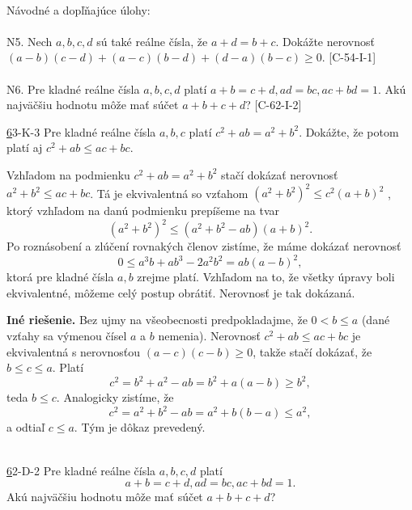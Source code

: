 \\
Návodné a dopľňajúce úlohy:\\
\\
N5. Nech $a, b, c, d$ sú také reálne čísla, že $a + d = b + c$. Dokážte nerovnosť $(a - b)(c - d)+ (a - c)(b - d) + (d - a)(b - c) \geq 0$. [C-54-I-1]\\
\\
N6. Pre kladné reálne čísla $a, b, c, d$ platí $a + b = c + d, ad = bc, ac + bd = 1$. Akú najväčšiu hodnotu môže mať súčet $a + b + c + d$? [C-62-I-2]\\

\begin{tcolorbox}[breakable,notitle,boxrule=0pt,colback=light-gray,colframe=light-gray]\ul 63-K-3 Pre kladné reálne čísla $a, b, c$ platí $c^2 + ab = a^2 + b^2$. Dokážte, že potom platí aj $c^2 + ab \leq ac + bc$.\\


\end{tcolorbox}

\rie Vzhľadom na podmienku $c^2 + ab = a^2 + b^2$ stačí dokázať nerovnosť $a^2 + b^2 \leq ac + bc$. Tá je ekvivalentná so vzťahom $(a^2 + b^2)^2 \leq c^2 (a + b)^2$ , ktorý vzhľadom
na danú podmienku prepíšeme na tvar $$ (a^2+ b^2)^2 \leq (a^2+
b^2 - ab)(a + b)^2.$$
Po roznásobení a zlúčení rovnakých členov zistíme, že máme dokázať nerovnosť $$0 \leq a^3b + ab^3 - 2a^2b^2= ab(a - b)^2,$$ ktorá pre kladné čísla $a, b$ zrejme platí. Vzhľadom na to, že všetky úpravy boli ekvivalentné, môžeme celý postup obrátiť. Nerovnosť je tak dokázaná.

\textbf{Iné riešenie.} Bez ujmy na všeobecnosti predpokladajme, že $0 < b \leq a$ (dané vzťahy sa výmenou čísel $a$ a $b$ nemenia). Nerovnosť $c^2 +ab \leq ac+bc$ je ekvivalentná s nerovnosťou
$(a - c)(c - b) \geq 0$, takže stačí dokázať, že $b \leq c \leq a$. Platí $$c^2 = b^2+ a^2 - ab = b^2+ a(a - b) \geq b^2,$$
teda $b \leq c$. Analogicky zistíme, že $$c^2= a^2+ b^2 - ab =a^2+ b(b - a) \leq a^2,$$
a odtiaľ $c \leq a$. Tým je dôkaz prevedený.\\
\\
\begin{tcolorbox}[breakable,notitle,boxrule=0pt,colback=light-gray,colframe=light-gray]\ul 62-D-2 Pre kladné reálne čísla $a, b, c, d$ platí
$$a + b = c + d, ad = bc, ac + bd = 1.$$
Akú najväčšiu hodnotu môže mať súčet $a + b + c + d$?

\end{tcolorbox}

